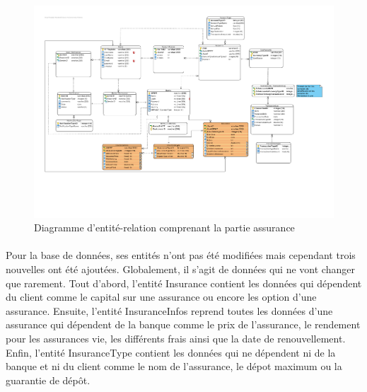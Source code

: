 \begin{figure}[ht]
    \centering
    \includegraphics[scale=0.55]{img/BDDAssurance.pdf}
    \caption{Diagramme d'entité-relation comprenant la partie assurance}
    \label{fig1}
    \end{figure}
    
    \paragraph{}Pour la base de données, ses entités n’ont pas été modifiées mais cependant trois nouvelles ont été ajoutées. Globalement, il s’agit de données qui ne vont changer que rarement. Tout d’abord, l’entité Insurance contient les données qui dépendent du client comme le capital sur une assurance ou encore les option d’une assurance. Ensuite, l’entité InsuranceInfos reprend toutes les données d’une assurance qui dépendent de la banque comme le prix de l’assurance, le rendement pour les assurances vie, les différents frais ainsi que la date de renouvellement. Enfin, l’entité InsuranceType contient les données qui ne dépendent ni de la banque et ni du client comme le nom de l’assurance, le dépot maximum ou la guarantie de dépôt.
    